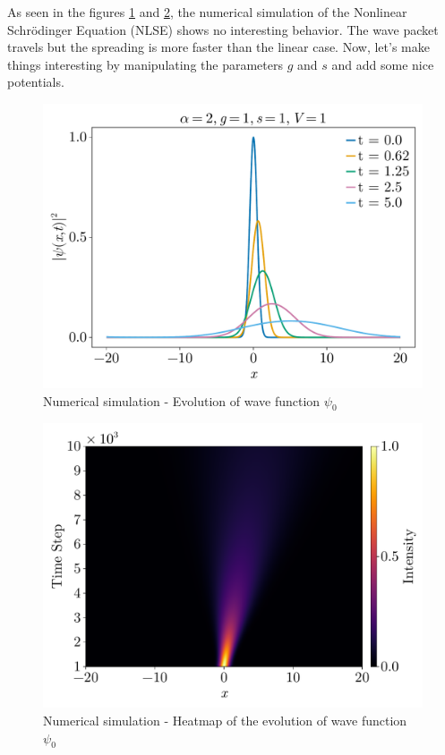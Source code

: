 \documentclass[8pt, a4paper, twocolumn]{article}
\begin{document}
As seen in the figures \ref{fig:nlse_evolution} and \ref{fig:nlse_heatmap}, the numerical 
simulation of the Nonlinear Schrödinger Equation (NLSE) shows no interesting behavior. The wave 
packet travels but the spreading is more faster than the linear case. Now, let's make things interesting by manipulating the parameters $g$ and $s$ and add some nice 
potentials.
\begin{figure}[h!]
	\centering
	\includegraphics[width=\linewidth]{../figs/nlse_evolution_00.pdf}
	\caption{Numerical simulation - Evolution of wave function $\psi_0$}
	\label{fig:nlse_evolution}
\end{figure}
\begin{figure}[h!]
	\centering
	\includegraphics[width=\linewidth]{../figs/nlse_heatmap_00.pdf}
	\caption{Numerical simulation - Heatmap of the evolution of wave function $\psi_0$}
	\label{fig:nlse_heatmap}
\end{figure}
\end{document}
